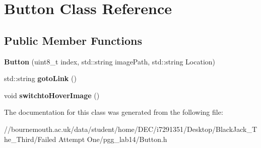 \hypertarget{class_button}{\section{Button Class Reference}
\label{class_button}
}
\subsection*{Public Member Functions}
\begin{DoxyCompactItemize}
\item 
\hypertarget{class_button_a3bfb5212895af8867d27d0d0498f4ba6}{{\bfseries Button} (uint8\+\_\+t index, std\+::string image\+Path, std\+::string Location)}\label{class_button_a3bfb5212895af8867d27d0d0498f4ba6}

\item 
\hypertarget{class_button_a506577042744845dca4d7318e5bf1275}{std\+::string {\bfseries goto\+Link} ()}\label{class_button_a506577042744845dca4d7318e5bf1275}

\item 
\hypertarget{class_button_a4eea3d0dae20dd26292edd36c1af35a2}{void {\bfseries switchto\+Hover\+Image} ()}\label{class_button_a4eea3d0dae20dd26292edd36c1af35a2}

\end{DoxyCompactItemize}


The documentation for this class was generated from the following file\+:\begin{DoxyCompactItemize}
\item 
//bournemouth.\+ac.\+uk/data/student/home/\+D\+E\+C/i7291351/\+Desktop/\+Black\+Jack\+\_\+\+The\+\_\+\+Third/\+Failed Attempt One/pgg\+\_\+lab14/Button.\+h\end{DoxyCompactItemize}
